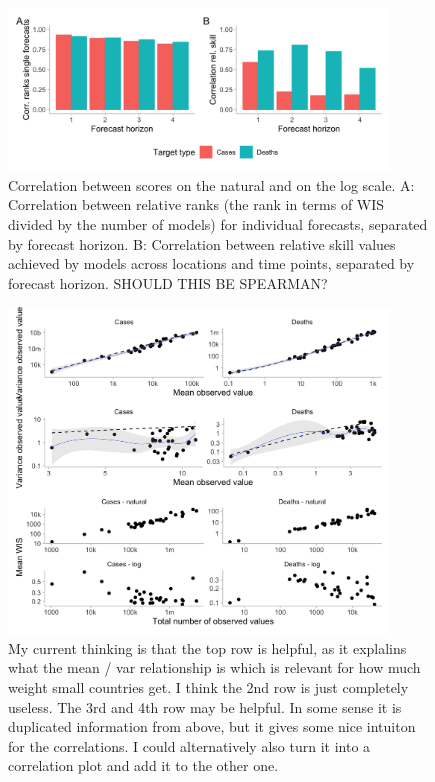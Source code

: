 \documentclass{article}
\begin{document}
\begin{figure}[h!]
    \centering
    \includegraphics[width=0.9\textwidth]{output/figures/HUB-cors.png}
    \caption{Correlation between scores on the natural and on the log scale. A: Correlation between relative ranks (the rank in terms of WIS divided by the number of models) for individual forecasts, separated by forecast horizon. B: Correlation between relative skill values achieved by models across locations and time points, separated by forecast horizon. SHOULD THIS BE SPEARMAN?}
    \label{fig:HUB-cors}
\end{figure}


\begin{figure}[h!]
    \centering
    \includegraphics[width=0.9\textwidth]{output/figures/HUB-mean-scores-vs-total-log-log.png}
    \caption{My current thinking is that the top row is helpful, as it explalins what the mean / var relationship is which is relevant for how much weight small countries get. I think the 2nd row is just completely useless. The 3rd and 4th row may be helpful. In some sense it is duplicated information from above, but it gives some nice intuiton for the correlations. I could alternatively also turn it into a correlation plot and add it to the other one. }
    \label{fig:HUB-mean-scores-total-loglog}
\end{figure}
\end{document}
